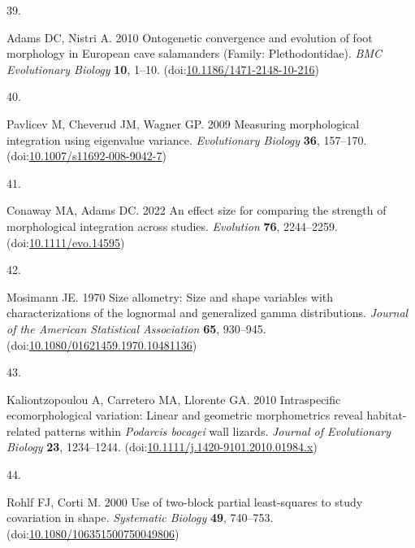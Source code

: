 \documentclass[
  11pt,
]{article}
\newlength{\cslhangindent}
\newlength{\csllabelwidth}
\newlength{\cslentryspacingunit} %
\newenvironment{CSLReferences}[2] %
 {%
  \setlength{\parindent}{0pt}
  \ifodd #1
  \let\oldpar\par
  \def\par{\hangindent=\cslhangindent\oldpar}
  \fi
  \setlength{\parskip}{#2\cslentryspacingunit}
 }%
 {}
\newcommand{\CSLLeftMargin}[1]{\parbox[t]{\csllabelwidth}{#1}}
\newcommand{\CSLRightInline}[1]{\parbox[t]{\linewidth - \csllabelwidth}{#1}\break}
\providecommand{\DIFaddbegin}{} %
\providecommand{\DIFaddend}{} %
\providecommand{\DIFdelbegin}{} %
\providecommand{\DIFdelend}{} %
\newcommand{\DIFscaledelfig}{0.5}
\newlength{\DIFdelgraphicswidth} %
\newlength{\DIFdelgraphicsheight} %
\newcommand{\DIFaddincludegraphics}[2][]{{\color{blue}\fbox{\DIFOincludegraphics[#1]{#2}}}} %
\newcommand{\DIFdelincludegraphics}[2][]{%
\sbox{\DIFdelgraphicsbox}{\DIFOincludegraphics[#1]{#2}}%
\settoboxwidth{\DIFdelgraphicswidth}{\DIFdelgraphicsbox} %
\settoboxtotalheight{\DIFdelgraphicsheight}{\DIFdelgraphicsbox} %
\scalebox{\DIFscaledelfig}{%
\parbox[b]{\DIFdelgraphicswidth}{\usebox{\DIFdelgraphicsbox}\\[-\baselineskip] \rule{\DIFdelgraphicswidth}{0em}}\llap{\resizebox{\DIFdelgraphicswidth}{\DIFdelgraphicsheight}{%
\setlength{\unitlength}{\DIFdelgraphicswidth}%
\begin{picture}(1,1)%
\thicklines\linethickness{2pt} %
{\color[rgb]{1,0,0}\put(0,0){\framebox(1,1){}}}%
{\color[rgb]{1,0,0}\put(0,0){\line( 1,1){1}}}%
{\color[rgb]{1,0,0}\put(0,1){\line(1,-1){1}}}%
\end{picture}%
}\hspace*{3pt}}} %
} %
\DeclareRobustCommand{\DIFaddbegin}{\DIFOaddbegin \let\includegraphics\DIFaddincludegraphics} %
\DeclareRobustCommand{\DIFaddend}{\DIFOaddend \let\includegraphics\DIFOincludegraphics} %
\DeclareRobustCommand{\DIFdelbegin}{\DIFOdelbegin \let\includegraphics\DIFdelincludegraphics} %
\DeclareRobustCommand{\DIFdelend}{\DIFOaddend \let\includegraphics\DIFOincludegraphics} %
\begin{document}
\begin{CSLReferences}{0}{0}
\leavevmode{}%
\CSLLeftMargin{39. }%
\DIFdelbegin %
\DIFdelend \DIFaddbegin \CSLRightInline{Adams DC, Nistri A. 2010 Ontogenetic convergence and
evolution of foot morphology in {E}uropean cave salamanders ({F}amily:
{P}lethodontidae). \emph{BMC Evolutionary Biology} \textbf{10}, 1--10.
(doi:\href{https://doi.org/10.1186/1471-2148-10-216}{10.1186/1471-2148-10-216})}
\DIFaddend 

\leavevmode{}%
\CSLLeftMargin{40. }%
\CSLRightInline{Pavlicev M, Cheverud JM, Wagner GP. 2009 Measuring
morphological integration using eigenvalue variance. \emph{Evolutionary
Biology} \textbf{36}, 157--170.
(doi:\href{https://doi.org/10.1007/s11692-008-9042-7}{10.1007/s11692-008-9042-7})}

\leavevmode{}%
\CSLLeftMargin{41. }%
\CSLRightInline{Conaway MA, Adams DC. 2022 An effect size for comparing
the strength of morphological integration across studies.
\emph{Evolution} \textbf{76}, 2244--2259.
(doi:\href{https://doi.org/10.1111/evo.14595}{10.1111/evo.14595})}

\leavevmode{}%
\CSLLeftMargin{42. }%
\CSLRightInline{Mosimann JE. 1970 Size allometry: Size and shape
variables with characterizations of the lognormal and generalized gamma
distributions. \emph{Journal of the American Statistical Association}
\textbf{65}, 930--945.
(doi:\href{https://doi.org/10.1080/01621459.1970.10481136}{10.1080/01621459.1970.10481136})}

\leavevmode{}%
\CSLLeftMargin{43. }%
\CSLRightInline{Kaliontzopoulou A, Carretero MA, Llorente GA. 2010
Intraspecific ecomorphological variation: Linear and geometric
morphometrics reveal habitat-related patterns within \emph{{P}odarcis
bocagei} wall lizards. \emph{Journal of Evolutionary Biology}
\textbf{23}, 1234--1244.
(doi:\href{https://doi.org/10.1111/j.1420-9101.2010.01984.x}{10.1111/j.1420-9101.2010.01984.x})}

\leavevmode{}%
\CSLLeftMargin{44. }%
\CSLRightInline{Rohlf FJ, Corti M. 2000 Use of two-block partial
least-squares to study covariation in shape. \emph{Systematic Biology}
\textbf{49}, 740--753.
(doi:\href{https://doi.org/10.1080/106351500750049806}{10.1080/106351500750049806})}


\end{CSLReferences}
\end{document}
